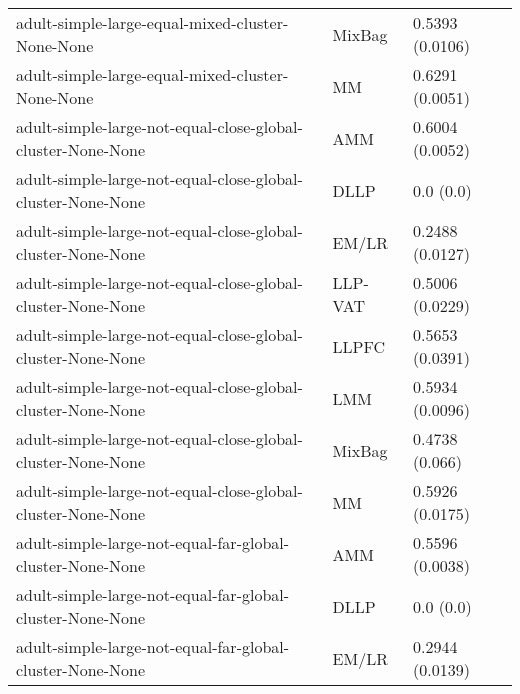 \begin{longtable}{lll}
                                                             adult-simple-large-equal-mixed-cluster-None-None &    MixBag &                           0.5393 (0.0106) \\
                                                             adult-simple-large-equal-mixed-cluster-None-None &        MM &                           0.6291 (0.0051) \\
                                                  adult-simple-large-not-equal-close-global-cluster-None-None &       AMM &                           0.6004 (0.0052) \\
                                                  adult-simple-large-not-equal-close-global-cluster-None-None &      DLLP &                                 0.0 (0.0) \\
                                                  adult-simple-large-not-equal-close-global-cluster-None-None &     EM/LR &                           0.2488 (0.0127) \\
                                                  adult-simple-large-not-equal-close-global-cluster-None-None &   LLP-VAT &                           0.5006 (0.0229) \\
                                                  adult-simple-large-not-equal-close-global-cluster-None-None &     LLPFC &                           0.5653 (0.0391) \\
                                                  adult-simple-large-not-equal-close-global-cluster-None-None &       LMM &                           0.5934 (0.0096) \\
                                                  adult-simple-large-not-equal-close-global-cluster-None-None &    MixBag &                            0.4738 (0.066) \\
                                                  adult-simple-large-not-equal-close-global-cluster-None-None &        MM &                           0.5926 (0.0175) \\
                                                    adult-simple-large-not-equal-far-global-cluster-None-None &       AMM &                           0.5596 (0.0038) \\
                                                    adult-simple-large-not-equal-far-global-cluster-None-None &      DLLP &                                 0.0 (0.0) \\
                                                    adult-simple-large-not-equal-far-global-cluster-None-None &     EM/LR &                           0.2944 (0.0139) \\

\end{longtable}
